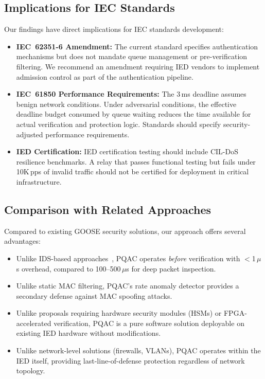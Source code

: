 \documentclass{ieeeaccess}
\begin{document}
\subsection{Implications for IEC Standards}
Our findings have direct implications for IEC standards development:
\begin{itemize}[leftmargin=*]
    \item \textbf{IEC~62351-6 Amendment:} The current standard specifies authentication mechanisms but does not mandate queue management or pre-verification filtering. We recommend an amendment requiring IED vendors to implement admission control as part of the authentication pipeline.
    \item \textbf{IEC~61850 Performance Requirements:} The 3\,ms deadline assumes benign network conditions. Under adversarial conditions, the effective deadline budget consumed by queue waiting reduces the time available for actual verification and protection logic. Standards should specify security-adjusted performance requirements.
    \item \textbf{IED Certification:} IED certification testing should include CIL-DoS resilience benchmarks. A relay that passes functional testing but fails under 10K\,pps of invalid traffic should not be certified for deployment in critical infrastructure.
\end{itemize}

\subsection{Comparison with Related Approaches}
Compared to existing GOOSE security solutions, our approach offers several advantages:
\begin{itemize}[leftmargin=*]
    \item Unlike IDS-based approaches~\cite{hussain2019goose}, PQAC operates \emph{before} verification with $<$1\,$\mu$s overhead, compared to 100--500\,$\mu$s for deep packet inspection.
    \item Unlike static MAC filtering, PQAC's rate anomaly detector provides a secondary defense against MAC spoofing attacks.
    \item Unlike proposals requiring hardware security modules (HSMs) or FPGA-accelerated verification, PQAC is a pure software solution deployable on existing IED hardware without modifications.
    \item Unlike network-level solutions (firewalls, VLANs), PQAC operates within the IED itself, providing last-line-of-defense protection regardless of network topology.
\end{itemize}
\end{document}
